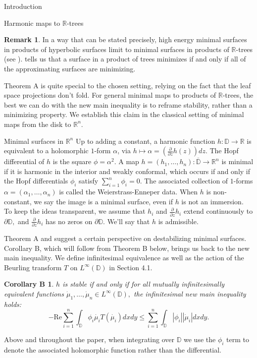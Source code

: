 \documentclass[10pt]{amsart}
\newcommand{\R}{\mathbb R}
\newtheorem*{corb}{Corollary B}
\theoremstyle{definition}
\newtheorem{remark}[thm]{Remark}
\begin{document}
\begin{section}{Introduction}
\begin{subsection}{Harmonic maps to $\R$-trees}
\begin{remark}
    In a way that can be stated precisely, high energy minimal surfaces in products of hyperbolic surfaces limit to minimal surfaces in products of $\R$-trees (see \cite{W}). \cite[Theorem B2]{MSS} tells us that a surface in a product of trees minimizes if and only if all of the approximating surfaces are minimizing.
\end{remark}
Theorem A is quite special to the chosen setting, relying on the fact that the leaf space projections don't fold. For general minimal maps to products of $\R$-trees, the best we can do with the new main inequality is to reframe stability, rather than a minimizing property. We establish this claim in the classical setting of minimal maps from the disk to $\R^n$. 
\end{subsection}

\begin{subsection}{Minimal surfaces in $\R^n$}
Up to adding a constant, a harmonic function $h:\mathbb{D}\to \mathbb{R}$ is equivalent to a holomorphic $1$-form $\alpha$, via $h\mapsto \alpha=(\frac{\partial}{\partial z}h(z))dz$. The Hopf differential of $h$ is the square $\phi=\alpha^2.$ A map $h=(h_1,\dots,h_n):\overline{\mathbb{D}}\to\mathbb{R}^n$ is minimal if it is harmonic in the interior and weakly conformal, which occurs if and only if the Hopf differentials $\phi_i$ satisfy $\sum_{i=1}^n \phi_i=0$. The associated collection of $1$-forms $\alpha=(\alpha_1,\dots, \alpha_n)$ is called the Weierstrass-Enneper data. When $h$ is non-constant, we say the image is a minimal surface, even if $h$ is not an immersion. To keep the ideas transparent, we assume that $h_i$ and $\frac{\partial}{\partial z} h_i$ extend continuously to $\partial\mathbb{D},$ and $\frac{\partial}{\partial z} h_i$ has no zeros on $\partial\mathbb{D}.$ We'll say that $h$ is admissible.

Theorem A and \cite[Sections 3-6]{M2} suggest a certain perspective on destabilizing minimal surfaces. Corollary B, which will follow from Theorem B below, brings us back to the new main inequality. We define infinitesimal equivalence as well as the action of the Beurling transform $T$ on $L^\infty(\mathbb{D})$ in Section 4.1. 
\begin{corb}
    $h$ is stable if and only if for all mutually infinitesimally equivalent functions $\dot{\mu}_1,\dots, \dot{\mu}_n\in L^\infty(\mathbb{D}),$ the infinitesimal new main inequality holds: 
    \begin{equation}\label{infnewmain}
        - \textrm{Re}\sum_{i=1}^n\int_{\mathbb{D}}\phi_i\dot{\mu_i}T(\dot{\mu_i})dxdy\leq \sum_{i=1}^n\int_{\mathbb{D}}|\phi_i||\dot{\mu}_i|dxdy.
    \end{equation}
\end{corb}
Above and throughout the paper, when integrating over $\mathbb{D}$ we use the $\phi_i$ term to denote the associated holomorphic function rather than the differential. 


\end{subsection}
\end{section}
\end{document}
